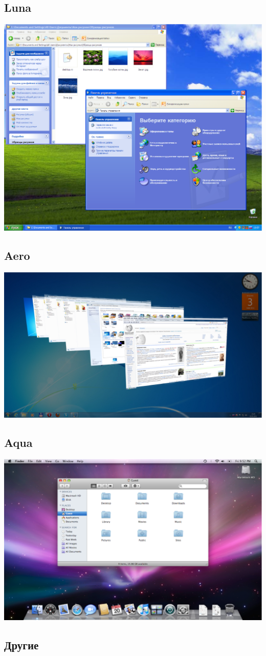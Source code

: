 \subsection{Luna}
\includegraphics[scale=0.28]{Software/Luna.eps}
\subsection{Aero}
\includegraphics[scale=0.25]{Software/Aero}
\subsection{Aqua}
\includegraphics[scale=0.38]{Software/Aqua}
\subsection{Другие}